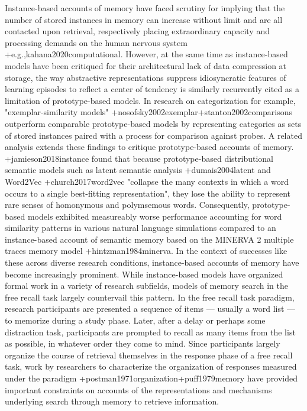 {}Instance-based accounts of memory have faced scrutiny for implying that the number of stored instances in memory can increase without limit and are all contacted upon retrieval, respectively placing extraordinary capacity and processing demands on the human nervous system +{e.g.,}{}{kahana2020computational}. However, at the same time as instance-based models have been critiqued for their architectural lack of data compression at storage, the way abstractive representations suppress idiosyncratic features of learning episodes to reflect a center of tendency is similarly recurrently cited as a limitation of prototype-based models. In research on categorization for example, "exemplar-similarity models" +{}{}{nosofsky2002exemplar}+{}{}{stanton2002comparisons} outperform comparable prototype-based models by representing categories as sets of stored instances paired with a process for comparison against probes. A related analysis extends these findings to critique prototype-based accounts of  memory. +{}{}{jamieson2018instance} found that because prototype-based distributional semantic models such as latent semantic analysis +{}{}{dumais2004latent} and Word2Vec +{}{}{church2017word2vec} "collapse the many contexts in which a word occurs to a single best-fitting representation", they lose the ability to represent rare senses of homonymous and polymsemous words. Consequently, prototype-based models exhibited measureably worse performance accounting for word similarity patterns in various natural language simulations compared to an instance-based account of semantic memory based on the MINERVA 2 multiple traces memory model +{}{}{hintzman1984minerva}. In the context of successes like these across diverse research conditions, instance-based accounts of memory have become increasingly prominent.\markdownRendererInterblockSeparator
{}While instance-based models have organized formal work in a variety of research subfields, models of memory search in the free recall task largely countervail this pattern. In the free recall task paradigm, research participants are presented a sequence of items --- usually a word list --- to memorize during a study phase. Later, after a delay or perhaps some distraction task, participants are prompted to recall as many items from the list as possible, in whatever order they come to mind. Since participants largely organize the course of retrieval themselves in the response phase of a free recall task, work by researchers to characterize the organization of responses measured under the paradigm +{}{}{postman1971organization}+{}{}{puff1979memory} have provided important constraints on accounts of the representations and mechanisms underlying search through memory to retrieve information.\markdownRendererInterblockSeparator
